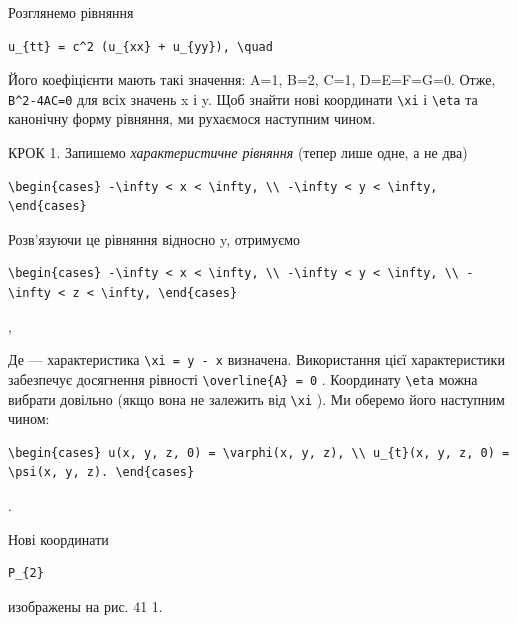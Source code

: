 \documentclass[
  ukrainian,
]{article}
\begin{document}
Розглянемо рівняння

\begin{verbatim}
u_{tt} = c^2 (u_{xx} + u_{yy}), \quad
\end{verbatim}

Його коефіцієнти мають такі значення: A=1, B=2, C=1, D=E=F=G=0. Отже,
\texttt{B\^{}2-4AC=0} для всіх значень x і y. Щоб знайти нові координати
\texttt{\textbackslash{}xi} і \texttt{\textbackslash{}eta} та канонічну
форму рівняння, ми рухаємося наступним чином.

КРОК 1. Запишемо \emph{характеристичне рівняння} (тепер лише одне, а не
два)

\begin{verbatim}
\begin{cases} -\infty < x < \infty, \\ -\infty < y < \infty, \end{cases}
\end{verbatim}

Розв'язуючи це рівняння відносно y, отримуємо

\begin{verbatim}
\begin{cases} -\infty < x < \infty, \\ -\infty < y < \infty, \\ -\infty < z < \infty, \end{cases}
\end{verbatim}

,

Де --- характеристика \texttt{\textbackslash{}xi\ =\ y\ -\ x} визначена.
Використання цієї характеристики забезпечує досягнення рівності
\texttt{\textbackslash{}overline\{A\}\ =\ 0} . Координату
\texttt{\textbackslash{}eta} можна вибрати довільно (якщо вона не
залежить від \texttt{\textbackslash{}xi} ). Ми оберемо його наступним
чином:

\begin{verbatim}
\begin{cases} u(x, y, z, 0) = \varphi(x, y, z), \\ u_{t}(x, y, z, 0) = \psi(x, y, z). \end{cases}
\end{verbatim}

.

Нові координати

\begin{verbatim}
P_{2}
\end{verbatim}

изображены на рис. 41 1.
\end{document}
